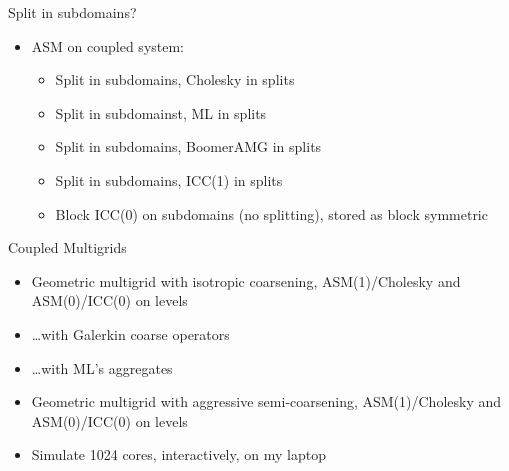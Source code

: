 \begin{frame}{Split in subdomains?}
  \begin{itemize}
  \item ASM on coupled system: {}
    \begin{itemize}
    \item Split in subdomains, Cholesky in splits \\
    {}
    \item Split in subdomainst, ML in splits \\
      {}
    \item Split in subdomains, BoomerAMG in splits \\
      {}
    \item Split in subdomains, ICC(1) in splits \\
      {}
    \item Block ICC(0) on subdomains (no splitting), stored as block symmetric
      {}
    \end{itemize}
  \end{itemize}
\end{frame}

\begin{frame}{Coupled Multigrids}
  \begin{itemize}
  \item Geometric multigrid with isotropic coarsening, ASM(1)/Cholesky and ASM(0)/ICC(0) on levels \\
    {}
  \item \ldots with Galerkin coarse operators \\
    {}
  \item \ldots with ML's aggregates \\
    {}
  \item Geometric multigrid with aggressive semi-coarsening, ASM(1)/Cholesky and ASM(0)/ICC(0) on levels \\
    {}
  \item Simulate 1024 cores, interactively, on my laptop \\
    {}
  \end{itemize}
\end{frame}

